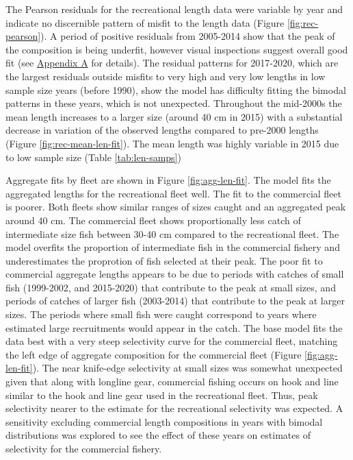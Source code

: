 \documentclass[11pt,
  english,
  a4paper,
]{article}
\begin{document}
The Pearson residuals for the recreational length data were variable by year and indicate no discernible pattern of misfit to the length data (Figure \ref{fig:rec-pearson}). A period of positive residuals from 2005-2014 show that the peak of the composition is being underfit, however visual inspections suggest overall good fit (see {\protect\hyperlink{append_a}{Appendix A}\leavevmode\tagmcend\tagstructend} for details). The residual patterns for 2017-2020, which are the largest residuals outside misfits to very high and very low lengths in low sample size years (before 1990), show the model has difficulty fitting the bimodal patterns in these years, which is not unexpected. Throughout the mid-2000s the mean length increases to a larger size (around 40 cm in 2015) with a substantial decrease in variation of the observed lengths compared to pre-2000 lengths (Figure \ref{fig:rec-mean-len-fit}). The mean length was highly variable in 2015 due to low sample size (Table \ref{tab:len-samps})

\leavevmode\tagmcend\tagstructend\par


Aggregate fits by fleet are shown in Figure \ref{fig:agg-len-fit}. The model fits the aggregated lengths for the recreational fleet well. The fit to the commercial fleet is poorer. Both fleets show similar ranges of sizes caught and an aggregated peak around 40 cm. The commercial fleet shows proportionally less catch of intermediate size fish between 30-40 cm compared to the recreational fleet. The model overfits the proportion of intermediate fish in the commercial fishery and underestimates the proprotion of fish selected at their peak. The poor fit to commercial aggregate lengths appears to be due to periods with catches of small fish (1999-2002, and 2015-2020) that contribute to the peak at small sizes, and periods of catches of larger fish (2003-2014) that contribute to the peak at larger sizes. The periods where small fish were caught correspond to years where estimated large recruitments would appear in the catch. The base model fits the data best with a very steep selectivity curve for the commercial fleet, matching the left edge of aggregate composition for the commercial fleet (Figure \ref{fig:agg-len-fit}). The near knife-edge selectivity at small sizes was somewhat unexpected given that along with longline gear, commercial fishing occurs on hook and line similar to the hook and line gear used in the recreational fleet. Thus, peak selectivity nearer to the estimate for the recreational selectivity was expected. A sensitivity excluding commercial length compositions in years with bimodal distributions was explored to see the effect of these years on estimates of selectivity for the commercial fishery.
\end{document}
